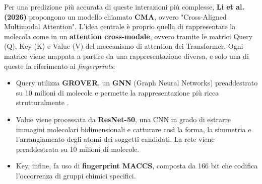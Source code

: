 Per una predizione più accurata di queste interazioni più complesse, \textbf{Li et al. (2026)} \cite{liEnhancingADMETProperty2026a} propongono un modello chiamato \textbf{CMA}, ovvero "Cross-Aligned Multimodal Attention". 
L'idea centrale è proprio quella di rappresentare la molecola come in un \textbf{attention cross-modale}, ovvero tramite le matrici Query (Q), Key (K) e Value (V) del meccanismo di attention dei Transformer. Ogni matrice viene mappata a partire da una rappresentazione diversa, e solo una di queste fa riferimento ai \textit{fingerprints}:
\begin{itemize}
    \item Query utilizza \textbf{GROVER}, un \textbf{GNN} (Graph Neural Networks) preaddestrato su 10 milioni di molecole e permette la rappresentazione più ricca strutturalmente \cite{liEnhancingADMETProperty2026a}.
    \item Value viene processata da \textbf{ResNet-50}, una CNN in grado di estrarre immagini molecolari bidimensionali e catturare così la forma, la simmetria e l'arrangiamento degli atomi dei soggetti candidati. La rete viene preaddestrata su 10 milioni di molecole.
    \item Key, infine, fa uso di \textbf{fingerprint MACCS}, composta da 166 bit che codifica l'occorrenza di gruppi chimici specifici.
\end{itemize}
\clearpage
